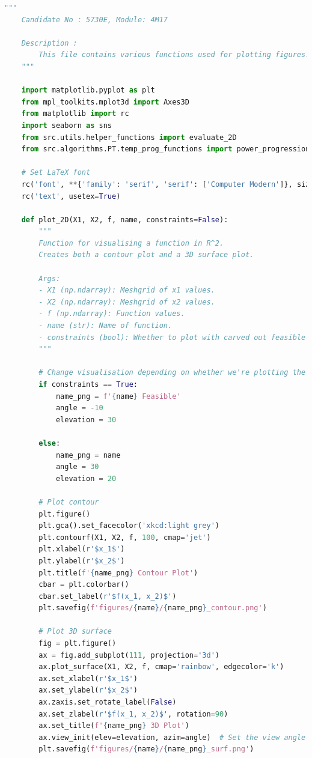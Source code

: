 \documentclass[10pt]{article}
\begin{document}
\begin{lstlisting}[language=Python, caption=plotting\_functions.py, label=plotting_functionspy]
    """
    Candidate No : 5730E, Module: 4M17 
    
    Description :
        This file contains various functions used for plotting figures.
    """
    
    import matplotlib.pyplot as plt
    from mpl_toolkits.mplot3d import Axes3D
    from matplotlib import rc
    import seaborn as sns
    from src.utils.helper_functions import evaluate_2D
    from src.algorithms.PT.temp_prog_functions import power_progression
    
    # Set LaTeX font
    rc('font', **{'family': 'serif', 'serif': ['Computer Modern']}, size=14)
    rc('text', usetex=True)
    
    def plot_2D(X1, X2, f, name, constraints=False):
        """
        Function for visualising a function in R^2. 
        Creates both a contour plot and a 3D surface plot.
    
        Args:
        - X1 (np.ndarray): Meshgrid of x1 values.
        - X2 (np.ndarray): Meshgrid of x2 values.
        - f (np.ndarray): Function values.
        - name (str): Name of function.
        - constraints (bool): Whether to plot with carved out feasible region or not.
        """
    
        # Change visualisation depending on whether we're plotting the carved out feasible region or not
        if constraints == True:
            name_png = f'{name} Feasible'
            angle = -10
            elevation = 30
    
        else: 
            name_png = name
            angle = 30
            elevation = 20
    
        # Plot contour
        plt.figure()
        plt.gca().set_facecolor('xkcd:light grey')
        plt.contourf(X1, X2, f, 100, cmap='jet')
        plt.xlabel(r'$x_1$')
        plt.ylabel(r'$x_2$')
        plt.title(f'{name_png} Contour Plot')
        cbar = plt.colorbar()
        cbar.set_label(r'$f(x_1, x_2)$')
        plt.savefig(f'figures/{name}/{name_png}_contour.png')
    
        # Plot 3D surface
        fig = plt.figure()
        ax = fig.add_subplot(111, projection='3d')
        ax.plot_surface(X1, X2, f, cmap='rainbow', edgecolor='k')
        ax.set_xlabel(r'$x_1$')
        ax.set_ylabel(r'$x_2$')
        ax.zaxis.set_rotate_label(False) 
        ax.set_zlabel(r'$f(x_1, x_2)$', rotation=90)
        ax.set_title(f'{name_png} 3D Plot')
        ax.view_init(elev=elevation, azim=angle)  # Set the view angle
        plt.savefig(f'figures/{name}/{name_png}_surf.png')
    

\end{lstlisting}
\end{document}
